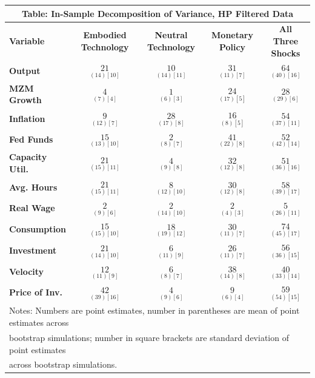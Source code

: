 \documentclass{article}
\begin{document}
 \begin{tabular}{|l|c|@{}c|c|@{}c|} 
 \hline 
 \multicolumn{5}{|c|}{\textbf{Table: In-Sample Decomposition of Variance, HP Filtered Data}} \\ \hline 
 \textbf{Variable} & \textbf{Embodied Technology} & \textbf{Neutral Technology} & \textbf{%
 Monetary Policy} & \textbf{All Three Shocks} \\ \hline\hline 
 \textbf{Output} & $\underset{( 14)[ 10]}{ 21}$ & $\underset{( 14)[ 11]}{ 10}$ & $\underset{( 11)[  7]}{ 31}$ & $\underset{( 40)[ 16]}{ 64}$ \\ \hline 
 \textbf{MZM Growth} & $\underset{(  7)[  4]}{  4}$ & $\underset{(  6)[  3]}{  1}$ & $\underset{( 17)[  5]}{ 24}$ & $\underset{( 29)[  6]}{ 28}$ \\ \hline 
 \textbf{Inflation} & $\underset{( 12)[  7]}{  9}$ & $\underset{( 17)[  8]}{ 28}$ & $\underset{(  8)[  5]}{ 16}$ & $\underset{( 37)[ 11]}{ 54}$ \\ \hline 
 \textbf{Fed Funds} & $\underset{( 13)[ 10]}{ 15}$ & $\underset{(  8)[  7]}{  2}$ & $\underset{( 22)[  8]}{ 41}$ & $\underset{( 42)[ 14]}{ 52}$ \\ \hline 
 \textbf{Capacity Util.} & $\underset{( 15)[ 11]}{ 21}$ & $\underset{(  9)[  8]}{  4}$ & $\underset{( 12)[  8]}{ 32}$ & $\underset{( 36)[ 16]}{ 51}$ \\ \hline 
 \textbf{Avg. Hours} & $\underset{( 15)[ 11]}{ 21}$ & $\underset{( 12)[ 10]}{  8}$ & $\underset{( 12)[  8]}{ 30}$ & $\underset{( 39)[ 17]}{ 58}$ \\ \hline 
 \textbf{Real Wage} & $\underset{(  9)[  6]}{  2}$ & $\underset{( 14)[ 10]}{  2}$ & $\underset{(  4)[  3]}{  2}$ & $\underset{( 26)[ 11]}{  5}$ \\ \hline 
 \textbf{Consumption} & $\underset{( 15)[ 10]}{ 15}$ & $\underset{( 19)[ 12]}{ 18}$ & $\underset{( 11)[  7]}{ 30}$ & $\underset{( 45)[ 17]}{ 74}$ \\ \hline 
 \textbf{Investment} & $\underset{( 14)[ 10]}{ 21}$ & $\underset{( 11)[  9]}{  6}$ & $\underset{( 11)[  7]}{ 26}$ & $\underset{( 36)[ 15]}{ 56}$ \\ \hline 
 \textbf{Velocity} & $\underset{( 11)[  9]}{ 12}$ & $\underset{(  8)[  7]}{  6}$ & $\underset{( 14)[  8]}{ 38}$ & $\underset{( 33)[ 14]}{ 40}$ \\ \hline 
 \textbf{Price of Inv.} & $\underset{( 39)[ 16]}{ 42}$ & $\underset{(  9)[  6]}{  4}  $ & $\underset{(  6)[  4]}{  9}$ & $\underset{( 54)[ 15]}{ 59}$ \\ \hline 
 \multicolumn{5}{|l|}{Notes: Numbers are point estimates, number in 
 parentheses are mean of point estimates across} \\ \hline 
 \multicolumn{5}{|l|}{bootstrap simulations; number in square brackets are 
 standard deviation of point estimates} \\ \hline 
 \multicolumn{5}{|l|}{across bootstrap simulations.} \\ \hline 
 \end{tabular} 
\end{document}
